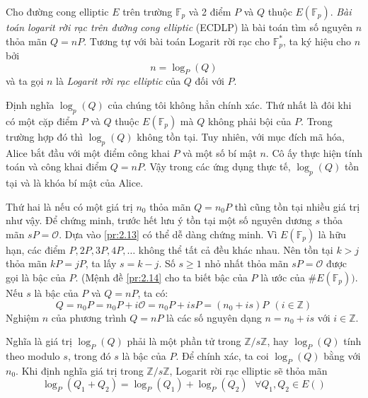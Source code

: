 \begin{definition}
	Cho đường cong elliptic $E$ trên trường $\mathbb{F}_p$ và 2 điểm $P$ và $Q$ thuộc $E(\mathbb{F}_p)$. \textit{Bài toán logarit rời rạc trên đường cong elliptic} (ECDLP) là bài toán tìm số nguyên $n$ thỏa mãn $Q=nP$.
	Tương tự với bài toán Logarit rời rạc cho $\mathbb{F}^*_p$, ta ký hiệu cho $n$ bởi
	$$  n = \log_P(Q)$$
	và ta gọi $n$ là \textit{Logarit rời rạc elliptic} của $Q$ đối với $P$.
\end{definition}

\begin{remark}
	Định nghĩa $\log_p(Q)$ của chúng tôi không hẳn chính xác. Thứ nhất là đôi khi có một cặp điểm $P$ và $Q$ thuộc $E(\mathbb{F}_p)$ mà $Q$ không phải bội của $P$.
	Trong trường hợp đó thì $\log_p(Q)$  không tồn tại. Tuy nhiên, với mục đích mã hóa, Alice bắt đầu với một điểm công khai $P$ và một số bí mật $n$. Cô ấy thực hiện tính toán và công khai điểm $Q = nP$.
	Vậy trong các ứng dụng thực tế, $\log_p(Q)$ tồn tại và là khóa bí mật của Alice.

	Thứ hai là nếu có một giá trị $n_0$ thỏa mãn $Q=n_0P$ thì cũng tồn tại nhiều giá trị như vậy. Để chứng minh, trước hết lưu ý tồn tại một số nguyên dương $s$ thỏa mãn $sP = \mathcal{O}$. Dựa vào \ref{pr:2.13} có thể dễ dàng chứng minh.
	Vì $E(\mathbb{F}_p)$ là hữu hạn, các điểm $P, 2P, 3P, 4P, \ldots$ không thể tất cả đều khác nhau. Nên tồn tại $k > j$ thỏa mãn $kP = jP$, ta lấy $s = k-j$.
	Số $s \geq 1$ nhỏ nhất thỏa mãn $sP = \mathcal{O}$ được gọi là bậc của $P$. (Mệnh đề \ref{pr:2.14} cho ta biết bậc của $P$ là ước của $\#E(\mathbb{F}_p))$.
	Nếu $s$ là bậc của $P$ và $Q = nP$, ta có:
	$$ Q = n_0P = n_0P + i\mathcal{O} = n_0P + isP = (n_0+is)P \ \  (i\in \mathbb{Z})$$
	Nghiệm $n$ của phương trình $Q = nP$ là các số nguyên dạng $ n = n_0+is$ với $i\in \mathbb{Z}.$

	Nghĩa là giá trị $\log_P(Q)$ phải là một phần tử trong $\mathbb{Z}/s\mathbb{Z}$, hay $\log_P(Q)$ tính theo modulo $s$, trong đó $s$ là bậc của $P$.
	Để chính xác, ta coi $\log_P(Q)$ bằng với $n_0$. Khi định nghĩa giá trị trong $\mathbb{Z}/s\mathbb{Z}$, Logarit rời rạc elliptic sẽ thỏa mãn
	$$ \log_P(Q_1 + Q_2) = \log_P(Q_1) + \log_P(Q_2) \ \ \ \forall Q_1, Q_2 \in E()$$


\end{remark}